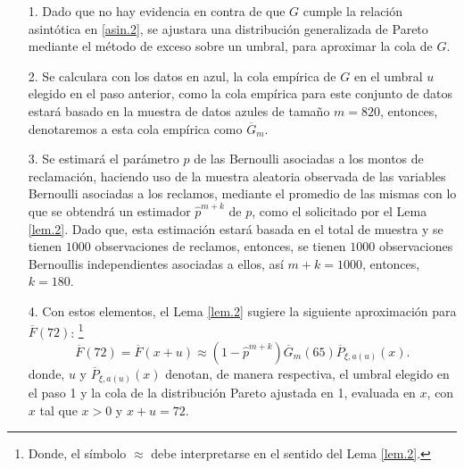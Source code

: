 \documentclass[10.5pt,notitlepage]{article}
\theoremstyle{plain}
\begin{document}
\begin{itemize}
    \item[1.] Dado que no hay evidencia en contra de que \(G\) cumple la relación asintótica en \eqref{asin.2}, se ajustara una distribución generalizada de Pareto mediante el método de exceso sobre un umbral, para aproximar la cola de \(G\).
    \item[2.] Se calculara con los datos en azul, la cola empírica de \(G\) en el umbral \(u\) elegido en el paso anterior, como la cola empírica para este conjunto de datos estará basado en la muestra de datos azules de tamaño \(m = 820\), entonces, denotaremos a esta cola empírica como \(\overline{G}_{m}\).
    \item[3.] Se estimará el parámetro \(p\) de las Bernoulli asociadas a los montos de reclamación, haciendo uso de la muestra aleatoria observada de las variables Bernoulli asociadas a los reclamos, mediante el promedio de las mismas con lo que se obtendrá un estimador \(\hat{p}^{m+k}\) de \(p\), como el solicitado por el Lema \ref{lem.2}. Dado que, esta estimación estará basada en el total de muestra y se tienen \(1000\) observaciones de reclamos, entonces, se tienen \(1000\) observaciones Bernoullis independientes asociadas a ellos, así \(m + k = 1000\), entonces, \(k = 180\).
    \item[4.] Con estos elementos, el Lema \ref{lem.2} sugiere la siguiente aproximación para \(\overline{F}(72)\): \footnote{Donde, el símbolo \(\approx\) debe interpretarse en el sentido del Lema \ref{lem.2}.}
    \[
     \overline{F}(72) = \overline{F}(x+u)\approx (1-\hat{p}^{m + k})\overline{G}_{m}(65)\overline{P}_{\xi,a(u)}(x).
    \]
    donde, \(u\) y \(\overline{P}_{\xi,a(u)}(x)\) denotan, de manera respectiva, el umbral elegido en el paso 1 y la cola de la distribución Pareto ajustada en 1, evaluada en \(x\), con \(x\) tal que \(x>0\) y \(x+u = 72\).
\end{itemize}
\end{document}
